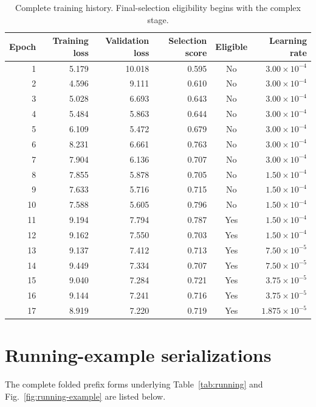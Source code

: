 \documentclass[pdflatex,sn-basic]{sn-jnl}
\begin{document}
\begin{table}[!t]
\centering
\caption{Complete training history. Final-selection eligibility begins with the complex stage.}
\label{tab:history}
\begin{tabular}{@{}rrrrcr@{}}
\toprule
Epoch & Training loss & Validation loss & Selection score & Eligible & Learning rate \\
\midrule
1  & 5.179 & 10.018 & 0.595 & No  & $3.00\times10^{-4}$ \\
2  & 4.596 & 9.111  & 0.610 & No  & $3.00\times10^{-4}$ \\
3  & 5.028 & 6.693  & 0.643 & No  & $3.00\times10^{-4}$ \\
4  & 5.484 & 5.863  & 0.644 & No  & $3.00\times10^{-4}$ \\
5  & 6.109 & 5.472  & 0.679 & No  & $3.00\times10^{-4}$ \\
6  & 8.231 & 6.661  & 0.763 & No  & $3.00\times10^{-4}$ \\
7  & 7.904 & 6.136  & 0.707 & No  & $3.00\times10^{-4}$ \\
8  & 7.855 & 5.878  & 0.705 & No  & $1.50\times10^{-4}$ \\
9  & 7.633 & 5.716  & 0.715 & No  & $1.50\times10^{-4}$ \\
10 & 7.588 & 5.605  & 0.796 & No  & $1.50\times10^{-4}$ \\
11 & 9.194 & 7.794  & 0.787 & Yes & $1.50\times10^{-4}$ \\
12 & 9.162 & 7.550  & 0.703 & Yes & $1.50\times10^{-4}$ \\
13 & 9.137 & 7.412  & 0.713 & Yes & $7.50\times10^{-5}$ \\
14 & 9.449 & 7.334  & 0.707 & Yes & $7.50\times10^{-5}$ \\
15 & 9.040 & 7.284  & 0.721 & Yes & $3.75\times10^{-5}$ \\
16 & 9.144 & 7.241  & 0.716 & Yes & $3.75\times10^{-5}$ \\
17 & 8.919 & 7.220  & 0.719 & Yes & $1.875\times10^{-5}$ \\
\bottomrule
\end{tabular}
\end{table}

\section{Running-example serializations}\label{app:serialized-example}

The complete folded prefix forms underlying Table~\ref{tab:running} and Fig.~\ref{fig:running-example} are listed below.
\end{document}
